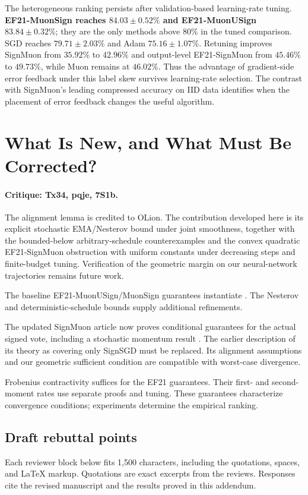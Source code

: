 The heterogeneous ranking persists after validation-based learning-rate tuning.
\textbf{EF21-MuonSign reaches $84.03\pm0.52\%$ and EF21-MuonUSign
$83.84\pm0.32\%$}; they are the only methods above $80\%$ in the tuned
comparison. SGD reaches $79.71\pm2.03\%$ and Adam $75.16\pm1.07\%$.
Retuning improves SignMuon from $35.92\%$ to $42.96\%$ and output-level
EF21-SignMuon from $45.46\%$ to $49.73\%$, while Muon remains at $46.02\%$.
Thus the advantage of gradient-side error feedback under this label skew
survives learning-rate selection. The contrast with SignMuon's leading
compressed accuracy on IID data identifies when the placement of error
feedback changes the useful algorithm.

\section{What Is New, and What Must Be Corrected?}
\label{add:novelty}
\paragraph{Critique: Tx34, pqje, 7S1b.}
The alignment lemma is credited to OLion. The contribution developed here
is its explicit stochastic EMA/Nesterov bound under joint smoothness,
together with the bounded-below arbitrary-schedule counterexamples and
the convex quadratic EF21-SignMuon obstruction with uniform constants
under decreasing steps and finite-budget tuning. Verification of the
geometric margin on our neural-network trajectories remains future work.

The baseline EF21-MuonUSign/MuonSign guarantees instantiate
\citet{gruntkowska2025error}. The Nesterov and deterministic-schedule
bounds supply additional refinements.

The updated SignMuon article now proves conditional guarantees for the
actual signed vote, including a stochastic momentum result
\citep{mishra2026signmuonv2}. The earlier description of its theory as
covering only SignSGD must be replaced. Its alignment assumptions and our
geometric sufficient condition are compatible with worst-case divergence.

Frobenius contractivity suffices for the EF21 guarantees. Their first- and
second-moment rates use separate proofs and tuning. These guarantees
characterize convergence conditions; experiments determine the empirical
ranking.

\subsection{Draft rebuttal points}
\label{add:rebuttals}
Each reviewer block below fits 1,500 characters, including the quotations,
spaces, and LaTeX markup. Quotations are exact excerpts from the reviews.
Responses cite the revised manuscript and the results proved in this addendum.

